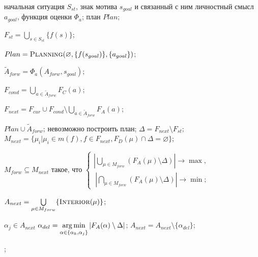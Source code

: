 	\Require начальная ситуация $S_{st}$, знак мотива $s_{goal}$ и связанный с ним личностный смысл $a_{goal}$, функция оценки $\Phi_a$;
	\Ensure план $Plan$;
	\algrule
	
	\State $F_{st}=\bigcup\limits_{s\in S_{st}}\{f(s)\}$; 
			
	\State $Plan=\Call{Planning}{\varnothing, \{f(s_{goal})\}, \{a_{goal}\}}$;

		\State $\tilde A_{forw}=\Phi_a(A_{forw},s_{goal})$; 
		
		\State $F_{cond} = \bigcup\limits_{a\in \tilde A_{forw}}F_C(a)$;

		\State $F_{next}=F_{cur}\cup F_{cond}\setminus\bigcup\limits_{a\in \tilde A_{forw}}F_A(a)$; 
		
			\State \Return $Plan\cup{\tilde A_{forw}}$;		
		\Else
				\State\Return невозможно построить план;
			\Else
				\State $\Delta=F_{next}\setminus F_{st}$; 					
				\State $M_{next}=\{\mu_i | \mu_i\in m(f), f\in F_{next},F_D(\mu)\cap\Delta=\varnothing\}$;
				
				\State $M_{forw}\subseteq M_{next}$ такое, что $\begin{cases}
				\left|\bigcup\limits_{\mu\in M_{forw}}\left(F_A(\mu)\setminus\Delta\right)\right|\rightarrow\max,\\
				\ \left|\bigcap\limits_{\mu\in M_{forw}}\left(F_A(\mu)\setminus\Delta\right)\right|\rightarrow\min;
				\end{cases}$ 
				
				\State $A_{next} = \bigcup\limits_{\mu\in M_{forw}}\{\Call{Interior}{\mu}\}$; 
				
				\ForAll $\alpha_j\in A_{next}$
						\State $\alpha_{del}=\operatorname*{arg\,min}\limits_{\alpha\in\{\alpha_k,\alpha_j\}}|F_A(\alpha)\setminus\Delta|$;
						\State $A_{next}= A_{next}\setminus\{\alpha_{del}\}$; 
					\EndIf
				\EndFor
				
				\State \Return {};						
			\EndIf
		\EndIf

	\EndFunction